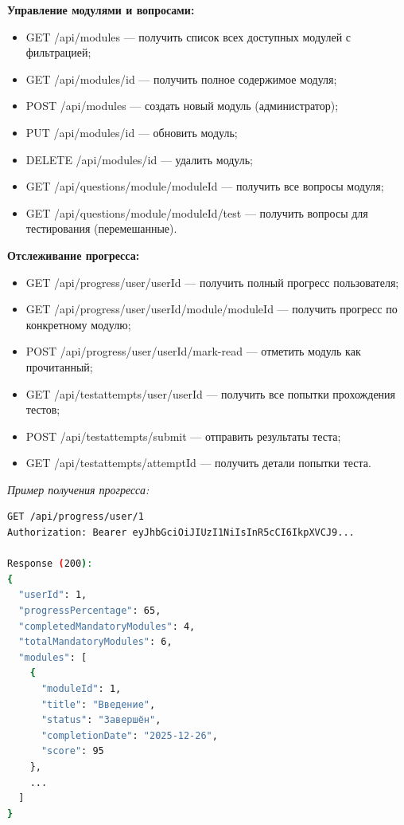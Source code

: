 \textbf{Управление модулями и вопросами:}
\begin{itemize}
    \item GET /api/modules --- получить список всех доступных модулей с фильтрацией;
    \item GET /api/modules/{id} --- получить полное содержимое модуля;
    \item POST /api/modules --- создать новый модуль (администратор);
    \item PUT /api/modules/{id} --- обновить модуль;
    \item DELETE /api/modules/{id} --- удалить модуль;
    \item GET /api/questions/module/{moduleId} --- получить все вопросы модуля;
    \item GET /api/questions/module/{moduleId}/test --- получить вопросы для тестирования (перемешанные).
\end{itemize}

\textbf{Отслеживание прогресса:}
\begin{itemize}
    \item GET /api/progress/user/{userId} --- получить полный прогресс пользователя;
    \item GET /api/progress/user/{userId}/module/{moduleId} --- получить прогресс по конкретному модулю;
    \item POST /api/progress/user/{userId}/mark-read --- отметить модуль как прочитанный;
    \item GET /api/testattempts/user/{userId} --- получить все попытки прохождения тестов;
    \item POST /api/testattempts/submit --- отправить результаты теста;
    \item GET /api/testattempts/{attemptId} --- получить детали попытки теста.
\end{itemize}

\textit{Пример получения прогресса:}
\begin{lstlisting}[language=bash, basicstyle=\ttfamily\small]
GET /api/progress/user/1
Authorization: Bearer eyJhbGciOiJIUzI1NiIsInR5cCI6IkpXVCJ9...

Response (200):
{
  "userId": 1,
  "progressPercentage": 65,
  "completedMandatoryModules": 4,
  "totalMandatoryModules": 6,
  "modules": [
    {
      "moduleId": 1,
      "title": "Введение",
      "status": "Завершён",
      "completionDate": "2025-12-26",
      "score": 95
    },
    ...
  ]
}
\end{lstlisting}

